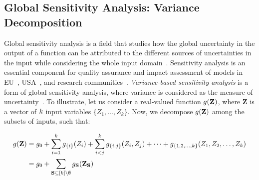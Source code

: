 

\subsection{Global Sensitivity Analysis: Variance Decomposition}
Global sensitivity analysis is a field that studies how the global uncertainty in the output of a function can be attributed to the different sources of uncertainties in the input while considering the whole input domain~\cite{saltelli2008global}.
Sensitivity analysis is an essential component for quality assurance and impact assessment of models in EU~\cite{eu}, USA~\cite{usepa}, and research communities~\cite{saltelli2020five}.
\emph{Variance-based sensitivity analysis} is a form of global sensitivity analysis, where variance is considered as the measure of uncertainty~\cite{sobol1990sensitivity,sobol2001global}. To illustrate, let us consider a real-valued function $  g(\mathbf{Z}) $, where $ \mathbf{Z} $ is a vector of $ k $ input variables $ \{Z_1, \dots, Z_k\} $. Now, we decompose $ g(\mathbf{Z}) $ among the subsets of inputs, such that:

\begin{align}
	\fiffunc(\mathbf{Z}) &= \fiffunc_0 + \sum_{i=1}^{\numnonsensitive} \fiffunc_{\{i\}}(Z_i) +  \sum_{i < j}^{\numnonsensitive} \fiffunc_{\{i,j\}}(Z_i, Z_j)  + \cdots  + \fiffunc_{\{1, 2, \dots, \numnonsensitive\}} (Z_1, Z_2, \dots, Z_{\numnonsensitive})\notag%
	\\    
	&= \fiffunc_0 +  \sum_{\mathbf{S} \subseteq [\numnonsensitive] \setminus \emptyset} \fiffunc_{\mathbf{S}}(\mathbf{Z}_{\mathbf{S}})\label{eq:functional_decomposition_set_notation}
\end{align}

